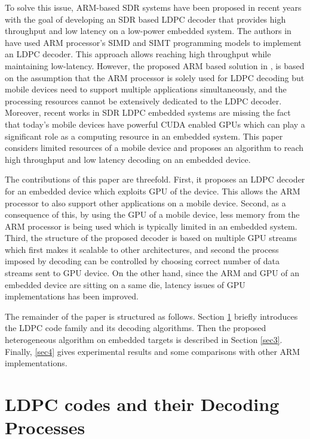\documentclass[conference]{IEEEtran}
\begin{document}
To solve this issue, ARM-based SDR systems have been proposed in recent years \cite{art_neon, art_ldpc_cpu0} with the goal of developing an SDR based LDPC decoder that provides high throughput and low latency on a low-power embedded system. The authors in \cite{art_neon} have used ARM processor's SIMD and SIMT programming models to implement an LDPC decoder. This approach allows reaching high throughput while maintaining low-latency. However, the proposed ARM based solution in \cite{art_neon}, is based on the assumption that the ARM processor is solely used for LDPC decoding but mobile devices need to support multiple applications simultaneously, and the processing resources cannot be extensively dedicated to the LDPC decoder. Moreover, recent works in SDR LDPC embedded systems are missing the fact that today's mobile devices have powerful CUDA enabled GPUs which can play a significant role as a computing resource in an embedded system. This paper considers limited resources of a mobile device and proposes an algorithm to reach high throughput and low latency decoding on an embedded device.

The contributions of this paper are threefold. First, it proposes an LDPC decoder for an embedded device which exploits GPU of the device. This allows the ARM processor to also support other applications on a mobile device. Second, as a consequence of this, by using the GPU of a mobile device, less memory from the ARM processor is being used which is typically limited in an embedded system. Third, the structure of the proposed decoder is based on multiple GPU streams which first makes it scalable to other architectures, and second the process imposed by decoding can be controlled by choosing correct number of data streams sent to GPU device. On the other hand, since the ARM and GPU of an embedded device are sitting on a same die, latency issues of GPU implementations has been improved.

The remainder of the paper is structured as follows. Section \ref{sec2} briefly introduces the LDPC code family and its decoding algorithms. Then the proposed heterogeneous algorithm on embedded targets is described in Section \ref{sec3}. Finally, \ref{sec4} gives experimental results and some comparisons with other ARM implementations.

\section{LDPC codes and their Decoding Processes}\label{sec2}
\end{document}

